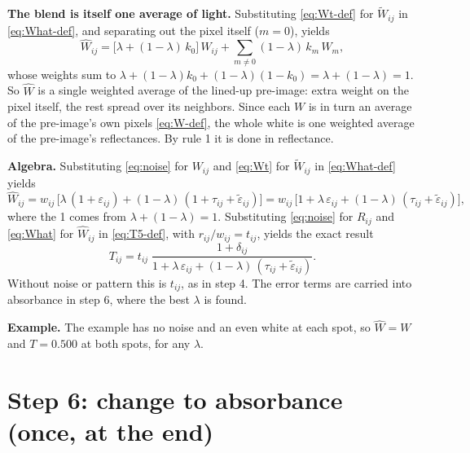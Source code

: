 \documentclass[11pt,letter]{article}
\begin{document}
\textbf{The blend is itself one average of light.}  Substituting
\eqref{eq:Wt-def} for $\widetilde W_{ij}$ in \eqref{eq:What-def}, and
separating out the pixel itself ($m = 0$), yields
\begin{equation}
  \widehat W_{ij} = \bigl[\lambda + (1 - \lambda)\, k_0\bigr]\, W_{ij}
    + \sum_{m \ne 0} (1 - \lambda)\, k_m\, W_m ,
  \label{eq:What-weights}
\end{equation}
whose weights sum to
$\lambda + (1-\lambda)k_0 + (1-\lambda)(1 - k_0) = \lambda + (1-\lambda) = 1$.
So $\widehat W$ is a single weighted average of the lined-up pre-image:
extra weight on the pixel itself, the rest spread over its neighbors.
Since each $W$ is in turn an average of the pre-image's own pixels
\eqref{eq:W-def}, the whole white is one weighted average of the
pre-image's reflectances.  By rule 1 it is done in reflectance.

\textbf{Algebra.}  Substituting \eqref{eq:noise} for $W_{ij}$ and
\eqref{eq:Wt} for $\widetilde W_{ij}$ in \eqref{eq:What-def} yields
\begin{equation}
  \widehat W_{ij} = w_{ij}\,\bigl[\lambda\,(1 + \varepsilon_{ij})
    + (1 - \lambda)\,(1 + \tau_{ij} + \widetilde\varepsilon_{ij})\bigr]
  = w_{ij}\,\bigl[1 + \lambda\,\varepsilon_{ij}
    + (1 - \lambda)\,(\tau_{ij} + \widetilde\varepsilon_{ij})\bigr],
  \label{eq:What}
\end{equation}
where the 1 comes from $\lambda + (1 - \lambda) = 1$.  Substituting
\eqref{eq:noise} for $R_{ij}$ and \eqref{eq:What} for $\widehat W_{ij}$ in
\eqref{eq:T5-def}, with $r_{ij}/w_{ij} = t_{ij}$, yields the exact result
\begin{equation}
  T_{ij} = t_{ij}\;
    \frac{1 + \delta_{ij}}
         {1 + \lambda\,\varepsilon_{ij}
            + (1 - \lambda)\,(\tau_{ij} + \widetilde\varepsilon_{ij})} .
  \label{eq:T5}
\end{equation}
Without noise or pattern this is $t_{ij}$, as in step 4.  The error terms
are carried into absorbance in step 6, where the best $\lambda$ is found.

\textbf{Example.}  The example has no noise and an even white at each spot,
so $\widehat W = W$ and $T = 0.500$ at both spots, for any $\lambda$.

\section{Step 6: change to absorbance (once, at the end)}
\label{sec:absorbance}
\end{document}
